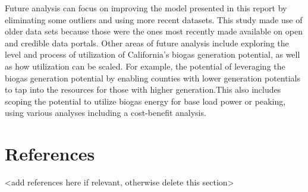 \documentclass[
  12pt,
]{article}
\begin{document}
Future analysis can focus on improving the model presented in this
report by eliminating some outliers and using more recent datasets. This
study made use of older data sets because those were the ones most
recently made available on open and credible data portals. Other areas
of future analysis include exploring the level and process of
utilization of California's biogas generation potential, as well as how
utilization can be scaled. For example, the potential of leveraging the
biogas generation potential by enabling counties with lower generation
potentials to tap into the resources for those with higher
generation.This also includes scoping the potential to utilize biogas
energy for base load power or peaking, using various analyses including
a cost-benefit analysis.

\newpage

\hypertarget{references}{%
\section{References}\label{references}}

\textless add references here if relevant, otherwise delete this
section\textgreater{}
\end{document}
